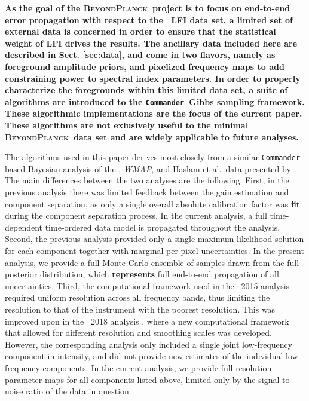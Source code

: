 \documentclass[twocolumn]{aa}
\def\WMAP{\emph{WMAP}}
\def\commander{\texttt{Commander}}
\newcommand{\BP}{\textsc{BeyondPlanck}}
\begin{document}

\textbf{As the goal of the \BP\ project is to focus on end-to-end error
propagation with respect to the \Planck\ LFI data set, a limited set of
external data is concerned in order to ensure that the statistical weight
of LFI drives the results. The ancillary data included here are described
in Sect. \ref{sec:data}, and come in two flavors, namely as foreground 
amplitude priors, and pixelized frequency maps to add constraining power to spectral index parameters.
In order to properly characterize the foregrounds within this limited data set,
a suite of algorithms are introduced to the \commander\ Gibbs sampling framework.
These algorithmic implementations are the focus of the current paper. These algorithms are not exlusively useful to the minimal \BP\ data set and are widely applicable to future analyses.}

The algorithms used in this paper derives most closely from a similar
\commander-based \citep{eriksen:2004,eriksen2008} Bayesian analysis of
the \Planck, \WMAP, and Haslam et al.\ data presented by
\citet{planck2014-a11}. The main differences between the two analyses
are the following. First, in the previous analysis there was limited
feedback between the gain estimation and component separation, as only
a single overall absolute calibration factor was \textbf{fit} during the
component separation process. In the current analysis, a full
time-dependent time-ordered data model is propagated throughout the
analysis. Second, the previous analysis provided only a single maximum
likelihood solution for each component together with marginal
per-pixel uncertainties. In the present analysis, we provide a full
Monte Carlo ensemble of samples drawn from the full posterior
distribution, which \textbf{represents} full end-to-end propagation of all
uncertainties. Third, the computational framework used in the
\Planck\ 2015 analysis required uniform resolution across all
frequency bands, thus limiting the resolution to that of the
instrument with the poorest resolution. This was improved upon in the
\Planck\ 2018 analysis \citep{planck2016-l04}, where a new
computational framework that allowed for different resolution and
smoothing scales was developed. However, the corresponding analysis
only included a single joint low-frequency component in intensity, and
did not provide new estimates of the individual low-frequency
components. In the current analysis, we provide full-resolution
parameter maps for all components listed above, limited only by the
signal-to-noise ratio of the data in question.
\end{document}
